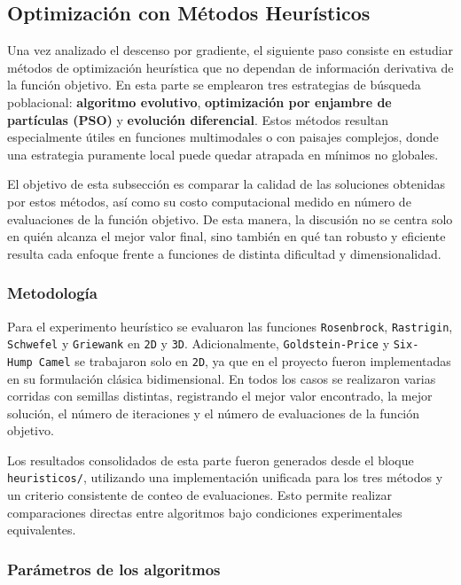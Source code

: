 \documentclass[
  12pt,
  letterpaper,
  DIV=11,
  numbers=noendperiod]{scrartcl}
\begin{document}
\subsection{Optimización con Métodos
Heurísticos}\label{optimizaciuxf3n-con-muxe9todos-heuruxedsticos}

Una vez analizado el descenso por gradiente, el siguiente paso consiste
en estudiar métodos de optimización heurística que no dependan de
información derivativa de la función objetivo. En esta parte se
emplearon tres estrategias de búsqueda poblacional: \textbf{algoritmo
evolutivo}, \textbf{optimización por enjambre de partículas (PSO)} y
\textbf{evolución diferencial}. Estos métodos resultan especialmente
útiles en funciones multimodales o con paisajes complejos, donde una
estrategia puramente local puede quedar atrapada en mínimos no globales.

El objetivo de esta subsección es comparar la calidad de las soluciones
obtenidas por estos métodos, así como su costo computacional medido en
número de evaluaciones de la función objetivo. De esta manera, la
discusión no se centra solo en quién alcanza el mejor valor final, sino
también en qué tan robusto y eficiente resulta cada enfoque frente a
funciones de distinta dificultad y dimensionalidad.

\subsubsection{Metodología}\label{metodologuxeda-1}

Para el experimento heurístico se evaluaron las funciones
\texttt{Rosenbrock}, \texttt{Rastrigin}, \texttt{Schwefel} y
\texttt{Griewank} en \texttt{2D} y \texttt{3D}. Adicionalmente,
\texttt{Goldstein-Price} y \texttt{Six-Hump\ Camel} se trabajaron solo
en \texttt{2D}, ya que en el proyecto fueron implementadas en su
formulación clásica bidimensional. En todos los casos se realizaron
varias corridas con semillas distintas, registrando el mejor valor
encontrado, la mejor solución, el número de iteraciones y el número de
evaluaciones de la función objetivo.

Los resultados consolidados de esta parte fueron generados desde el
bloque \texttt{heuristicos/}, utilizando una implementación unificada
para los tres métodos y un criterio consistente de conteo de
evaluaciones. Esto permite realizar comparaciones directas entre
algoritmos bajo condiciones experimentales equivalentes.

\subsubsection{Parámetros de los
algoritmos}\label{paruxe1metros-de-los-algoritmos}
\end{document}
